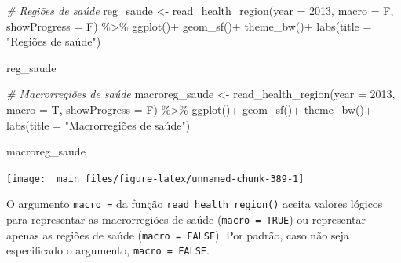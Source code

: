 \documentclass[
  brazilian,
]{book}
\newenvironment{Shaded}{\begin{snugshade}}{\end{snugshade}}
\newcommand{\AttributeTok}[1]{\textcolor[rgb]{0.77,0.63,0.00}{#1}}
\newcommand{\CommentTok}[1]{\textcolor[rgb]{0.56,0.35,0.01}{\textit{#1}}}
\newcommand{\DecValTok}[1]{\textcolor[rgb]{0.00,0.00,0.81}{#1}}
\newcommand{\FunctionTok}[1]{\textcolor[rgb]{0.00,0.00,0.00}{#1}}
\newcommand{\NormalTok}[1]{#1}
\newcommand{\OtherTok}[1]{\textcolor[rgb]{0.56,0.35,0.01}{#1}}
\newcommand{\SpecialCharTok}[1]{\textcolor[rgb]{0.00,0.00,0.00}{#1}}
\newcommand{\StringTok}[1]{\textcolor[rgb]{0.31,0.60,0.02}{#1}}
\begin{document}
\begin{Shaded}
\begin{Highlighting}[]
\CommentTok{\# Regiões de saúde}
\NormalTok{reg\_saude }\OtherTok{\textless{}{-}} \FunctionTok{read\_health\_region}\NormalTok{(}\AttributeTok{year =} \DecValTok{2013}\NormalTok{,}
                                \AttributeTok{macro =}\NormalTok{ F,}
                                \AttributeTok{showProgress =}\NormalTok{ F) }\SpecialCharTok{\%\textgreater{}\%}
  \FunctionTok{ggplot}\NormalTok{()}\SpecialCharTok{+}
  \FunctionTok{geom\_sf}\NormalTok{()}\SpecialCharTok{+}
  \FunctionTok{theme\_bw}\NormalTok{()}\SpecialCharTok{+}
  \FunctionTok{labs}\NormalTok{(}\AttributeTok{title =} \StringTok{"Regiões de saúde"}\NormalTok{)}

\NormalTok{reg\_saude}
\end{Highlighting}
\end{Shaded}

\begin{Shaded}
\begin{Highlighting}[]
\CommentTok{\# Macrorregiões de saúde}
\NormalTok{macroreg\_saude }\OtherTok{\textless{}{-}} \FunctionTok{read\_health\_region}\NormalTok{(}\AttributeTok{year =} \DecValTok{2013}\NormalTok{,}
                                     \AttributeTok{macro =}\NormalTok{ T,}
                                     \AttributeTok{showProgress =}\NormalTok{ F) }\SpecialCharTok{\%\textgreater{}\%}
  \FunctionTok{ggplot}\NormalTok{()}\SpecialCharTok{+}
  \FunctionTok{geom\_sf}\NormalTok{()}\SpecialCharTok{+}
  \FunctionTok{theme\_bw}\NormalTok{()}\SpecialCharTok{+}
  \FunctionTok{labs}\NormalTok{(}\AttributeTok{title =} \StringTok{"Macrorregiões de saúde"}\NormalTok{)}

\NormalTok{macroreg\_saude}
\end{Highlighting}
\end{Shaded}

\begin{center}\texttt{[image: \_main\_files/figure-latex/unnamed-chunk-389-1]} \end{center}

O argumento \texttt{macro\ =} da função \texttt{read\_health\_region()} aceita valores lógicos para representar as macrorregiões de saúde (\texttt{macro\ =\ TRUE}) ou representar apenas as regiões de saúde (\texttt{macro\ =\ FALSE}). Por padrão, caso não seja especificado o argumento, \texttt{macro\ =\ FALSE}.
\end{document}
